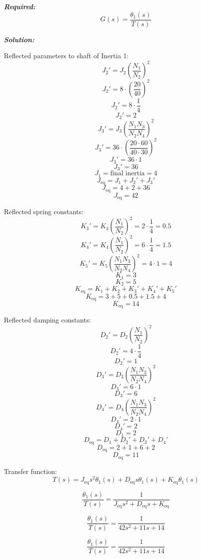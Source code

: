 \documentclass[11pt]{article}
\begin{document}
\vspace{12pt}

\noindent \textbf{\textit{Required:}}
\[
G(s) = \frac{\theta_1(s)}{T(s)}
\]

\vspace{12pt}


\noindent\textbf{\textit{Solution:}}

Reflected parameters to shaft of Inertia 1:
\[
J_2' = J_2 \left( \frac{N_1}{N_2} \right)^2 
\]
\[
J_2' = 8 \cdot \left( \frac{20}{40} \right)^2 
\]
\[
J_2' = 8 \cdot \frac{1}{4} 
\]
\[
J_2' = 2
\]
\[
J_3' = J_3 \left( \frac{N_1 N_3}{N_2 N_4} \right)^2 
\]
\[
J_3' = 36 \cdot \left( \frac{20 \cdot 60}{40 \cdot 30} \right)^2 
\]
\[
J_3' = 36 \cdot 1 
\]
\[
J_3' = 36
\]
\[
J_1 = \text{final inertia} = 4
\]
\[
J_{\text{eq}} = J_1 + J_2' + J_3' 
\]
\[
J_{\text{eq}} = 4 + 2 + 36 
\]
\[
J_{\text{eq}} = 42
\]

Reflected spring constants:
\[
K_3' = K_3 \left( \frac{N_1}{N_2} \right)^2 = 2 \cdot \frac{1}{4} = 0.5
\]
\[
K_4' = K_4 \left( \frac{N_1}{N_2} \right)^2 = 6 \cdot \frac{1}{4} = 1.5
\]
\[
K_5' = K_5 \left( \frac{N_1 N_3}{N_2 N_4} \right)^2 = 4 \cdot 1 = 4
\]
\[
K_1 = 3
\]
\[
K_2 = 5
\]
\[
K_{\text{eq}} = K_1 + K_2 + K_3' + K_4' + K_5' 
\]
\[
K_{\text{eq}} = 3 + 5 + 0.5 + 1.5 + 4 
\]
\[
K_{\text{eq}} = 14
\]

Reflected damping constants:
\[
D_2' = D_2 \left( \frac{N_1}{N_2} \right)^2 
\]
\[
D_2' = 4 \cdot \frac{1}{4} 
\]
\[
D_2' = 1
\]
\[
D_3' = D_3 \left( \frac{N_1 N_3}{N_2 N_4} \right)^2 
\]
\[
D_3' = 6 \cdot 1 
\]
\[
D_3' = 6
\]
\[
D_4' = D_4 \left( \frac{N_1 N_3}{N_2 N_4} \right)^2 
\]
\[
D_4' = 2 \cdot 1 
\]
\[
D_4' = 2
\]
\[
D_1 = 2
\]
\[
D_{\text{eq}} = D_1 + D_2' + D_3' + D_4' 
\]
\[
D_{\text{eq}} = 2 + 1 + 6 + 2 
\]
\[
D_{\text{eq}} = 11
\]

Transfer function:
\[
T(s) = J_{\text{eq}} s^2 \theta_1(s) + D_{\text{eq}} s \theta_1(s) + K_{\text{eq}} \theta_1(s)
\]

\[
\frac{\theta_1(s)}{T(s)} = \frac{1}{J_{\text{eq}} s^2 + D_{\text{eq}} s + K_{\text{eq}}}
\]

\[
\frac{\theta_1(s)}{T(s)} = \frac{1}{42 s^2 + 11 s + 14}
\]

\[
\boxed{\frac{\theta_1(s)}{T(s)} = \frac{1}{42 s^2 + 11 s + 14}}
\]


\end{document}

